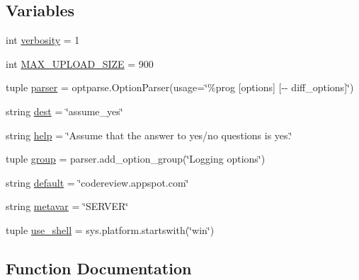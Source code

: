 \subsection*{Variables}
\begin{DoxyCompactItemize}
\item 
int \hyperlink{namespaceupload_a6e5956e7e291024e2fcf32034f7cf7a7}{verbosity} = 1
\item 
int \hyperlink{namespaceupload_a6966fd583e8e019501eed303639d79b4}{M\+A\+X\+\_\+\+U\+P\+L\+O\+A\+D\+\_\+\+S\+I\+Z\+E} = 900
\item 
tuple \hyperlink{namespaceupload_ab5aa3907065d7ff1de1405c141940845}{parser} = optparse.\+Option\+Parser(usage=\char`\"{}\%prog \mbox{[}options\mbox{]} \mbox{[}-\/-\/ diff\+\_\+options\mbox{]}\char`\"{})
\item 
string \hyperlink{namespaceupload_acddb2d9bf09b98fb6a205c368a8d8b1b}{dest} = \char`\"{}assume\+\_\+yes\char`\"{}
\item 
string \hyperlink{namespaceupload_a97085e2702061014275516de621b2143}{help} = \char`\"{}Assume that the answer to yes/no questions is \textquotesingle{}yes\textquotesingle{}.\char`\"{}
\item 
tuple \hyperlink{namespaceupload_a10f18f5b0686cf8efd48bed3c7531198}{group} = parser.\+add\+\_\+option\+\_\+group(\char`\"{}Logging options\char`\"{})
\item 
string \hyperlink{namespaceupload_af4be925d9a50d5ad134d86400509d0f2}{default} = \char`\"{}codereview.\+appspot.\+com\char`\"{}
\item 
string \hyperlink{namespaceupload_a058e182e9caed3e0dde4d45270b26ebd}{metavar} = \char`\"{}S\+E\+R\+V\+E\+R\char`\"{}
\item 
tuple \hyperlink{namespaceupload_a9e2d52f1f1f7d80f35bbdf032e04893c}{use\+\_\+shell} = sys.\+platform.\+startswith(\char`\"{}win\char`\"{})
\end{DoxyCompactItemize}


\subsection{Function Documentation}
\hypertarget{namespaceupload_a8c5b852d69edf142bee8a9eada1bd3dd}{}
